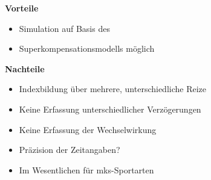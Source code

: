 \textbf{Vorteile}
  \begin{itemize}
    \item Simulation auf Basis des
    \item Superkompensationsmodells möglich
  \end{itemize}
\textbf{Nachteile}
  \begin{itemize}
    \item Indexbildung über mehrere, unterschiedliche Reize
    \item Keine Erfassung unterschiedlicher Verzögerungen
    \item Keine Erfassung der Wechselwirkung
    \item Präzision der Zeitangaben?
    \item Im Wesentlichen für mks-Sportarten
  \end{itemize}

